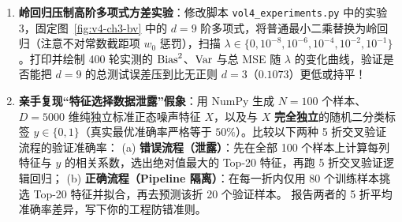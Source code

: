 \begin{enumerate}[label=\textbf{4.3.\arabic*}, leftmargin=3.3em, itemsep=5pt, start=7]
  \item\label{ex:4.3.7} \textbf{岭回归压制高阶多项式方差实验}：修改脚本 \texttt{vol4\_experiments.py} 中的实验 3，固定图~\ref{fig:v4-ch3-bv} 中的 $d = 9$ 阶多项式，将普通最小二乘替换为岭回归（注意不对常数截距项 $w_0$ 惩罚），扫描 $\lambda \in \{0, 10^{-8}, 10^{-6}, 10^{-4}, 10^{-2}, 10^{-1}\}$。打印并绘制 400 轮实测的 $\operatorname{Bias}^2$、$\operatorname{Var}$ 与总 MSE 随 $\lambda$ 的变化曲线，验证是否能把 $d=9$ 的总测试误差压到比无正则 $d=3$（$0.1073$）更低或持平！

  \item\label{ex:4.3.8} \textbf{亲手复现“特征选择数据泄露”假象}：用 NumPy 生成 $N = 100$ 个样本、$D = 5000$ 维纯独立标准正态噪声特征 $X$，以及与 $X$ \textbf{完全独立}的随机二分类标签 $y \in \{0, 1\}$（真实最优准确率严格等于 $50\%$）。比较以下两种 5 折交叉验证流程的验证准确率：
  (a) \textbf{错误流程（泄露）}：先在全部 100 个样本上计算每列特征与 $y$ 的相关系数，选出绝对值最大的 Top-20 特征，再跑 5 折交叉验证逻辑回归；
  (b) \textbf{正确流程（Pipeline 隔离）}：在每一折内仅用 80 个训练样本挑选 Top-20 特征并拟合，再去预测该折 20 个验证样本。
  报告两者的 5 折平均准确率差异，写下你的工程防错准则。
\end{enumerate}

